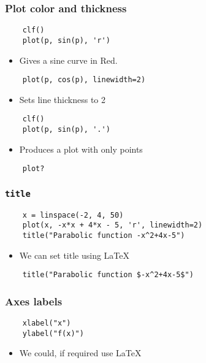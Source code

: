 \begin{frame}[fragile]
  \frametitle{Plot color and thickness}
  \begin{lstlisting}
    clf()
    plot(p, sin(p), 'r')
  \end{lstlisting}
  \begin{itemize}
  \item Gives a sine curve in Red. 
  \end{itemize}
  \begin{lstlisting}
    plot(p, cos(p), linewidth=2)
  \end{lstlisting}
  \begin{itemize}
  \item Sets line thickness to 2
  \end{itemize}
  \begin{lstlisting}
    clf()
    plot(p, sin(p), '.')
  \end{lstlisting}
  \begin{itemize}
  \item Produces a plot with only points
  \end{itemize}
  \begin{lstlisting}
    plot?
  \end{lstlisting}
\end{frame}

\begin{frame}[fragile]
  \frametitle{\texttt{title}}
  \begin{lstlisting}
    x = linspace(-2, 4, 50)
    plot(x, -x*x + 4*x - 5, 'r', linewidth=2)
    title("Parabolic function -x^2+4x-5")
  \end{lstlisting}
  \begin{itemize}
  \item We can set title using \LaTeX~ 
  \end{itemize}
  \begin{lstlisting}
    title("Parabolic function $-x^2+4x-5$")
  \end{lstlisting} 
\end{frame}

\begin{frame}[fragile]
  \frametitle{Axes labels}
  \begin{lstlisting}
    xlabel("x")
    ylabel("f(x)")
  \end{lstlisting}
  \begin{itemize}
  \item We could, if required use \LaTeX~ 
  \end{itemize}
\end{frame}

